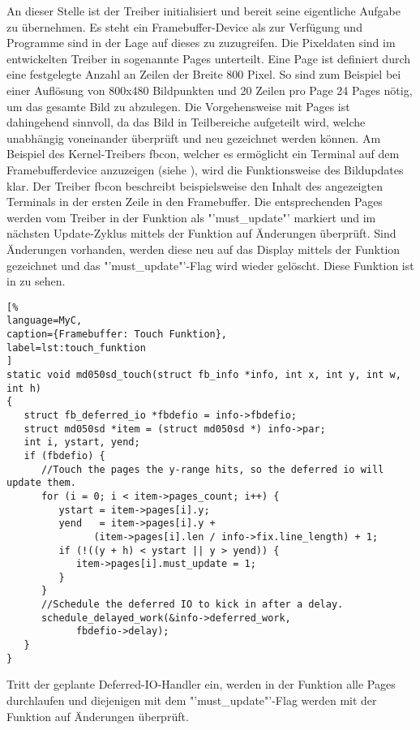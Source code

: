 An dieser Stelle ist der Treiber initialisiert und bereit seine eigentliche Aufgabe zu übernehmen. Es steht ein Framebuffer-Device als  zur Verfügung und Programme sind in der Lage auf dieses zu zuzugreifen.
Die Pixeldaten sind im entwickelten Treiber in sogenannte Pages unterteilt. Eine Page ist definiert durch eine festgelegte Anzahl an Zeilen der Breite 800 Pixel. So sind zum Beispiel bei einer Auflösung von 800x480 Bildpunkten und 20 Zeilen pro Page 24 Pages nötig, um das gesamte Bild zu abzulegen. Die Vorgehensweise mit Pages ist dahingehend sinnvoll, da das Bild in Teilbereiche aufgeteilt wird, welche unabhängig voneinander überprüft und neu gezeichnet werden können. Am Beispiel des Kernel-Treibers fbcon, welcher es ermöglicht ein Terminal auf dem Framebufferdevice anzuzeigen (siehe ), wird die Funktionsweise des Bildupdates klar. Der Treiber fbcon beschreibt beispielsweise den Inhalt des angezeigten Terminals in der ersten Zeile in den Framebuffer. Die entsprechenden Pages werden vom Treiber in der Funktion  als "'must\_update"' markiert und im nächsten Update-Zyklus mittels der Funktion  auf Änderungen überprüft. Sind Änderungen vorhanden, werden diese neu auf das Display mittels der Funktion  gezeichnet und das "'must\_update"'-Flag wird wieder gelöscht. Diese Funktion ist in
 zu sehen. 
\begin{lstlisting}[%
language=MyC,
caption={Framebuffer: Touch Funktion},
label=lst:touch_funktion
]
static void md050sd_touch(struct fb_info *info, int x, int y, int w, int h)
{
   struct fb_deferred_io *fbdefio = info->fbdefio;
   struct md050sd *item = (struct md050sd *) info->par;
   int i, ystart, yend;
   if (fbdefio) {
      //Touch the pages the y-range hits, so the deferred io will update them.
      for (i = 0; i < item->pages_count; i++) {
         ystart = item->pages[i].y;
         yend   = item->pages[i].y +
               (item->pages[i].len / info->fix.line_length) + 1;
         if (!((y + h) < ystart || y > yend)) {
            item->pages[i].must_update = 1;
         }
      }
      //Schedule the deferred IO to kick in after a delay.
      schedule_delayed_work(&info->deferred_work,
            fbdefio->delay);
   }
}
\end{lstlisting}
Tritt der geplante Deferred-IO-Handler ein, werden in der Funktion  alle Pages durchlaufen und diejenigen mit dem "'must\_update"'-Flag werden mit der Funktion  auf Änderungen überprüft.
